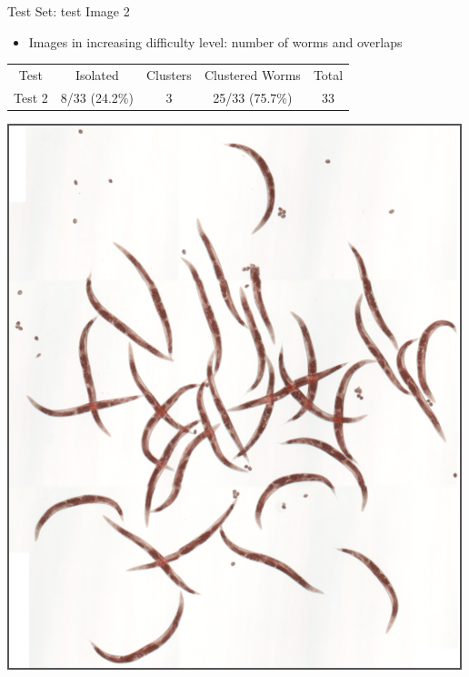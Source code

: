 \documentclass[xcolor=table]{beamer}
\begin{document}
\begin{frame}{Test Set: test Image 2}

  \begin{itemize}
  \item Images in increasing difficulty level: number of worms
    and overlaps
  \end{itemize}

\begin{table}[h]
\begin{center}
\begin{tabular}[h]{|c|c|c|c|c|}
    \hline
    \rowcolor{gray!35}
    Test & Isolated & Clusters & Clustered Worms & Total\\
    Test 2 & 8/33 (24.2\%) & 3 & 25/33 (75.7\%)& 33 \\    
    \hline
  \end{tabular}
\end{center}
\end{table}


\begin{center}
\includegraphics[scale=0.22]{results/test2/original2}
\end{center}

\end{frame}
\end{document}
